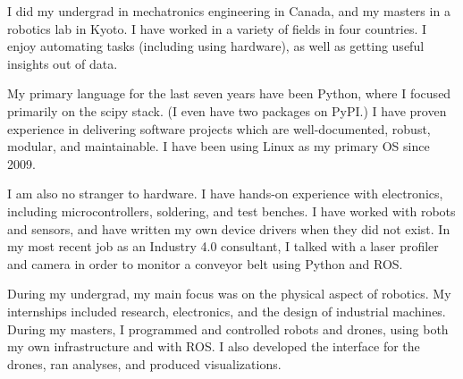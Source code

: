 I did my undergrad in mechatronics engineering in Canada, and my masters in a robotics lab in Kyoto. I have worked in a variety of fields in four countries. I enjoy automating tasks (including using hardware), as well as getting useful insights out of data.

My primary language for the last seven years have been Python, where I focused primarily on the scipy stack. (I even have two packages on PyPI.) I have proven experience in delivering software projects which are well-documented, robust, modular, and maintainable. I have been using Linux as my primary OS since 2009.

I am also no stranger to hardware. I have hands-on experience with electronics, including microcontrollers, soldering, and test benches. I have worked with robots and sensors, and have written my own device drivers when they did not exist. In my most recent job as an Industry 4.0 consultant, I talked with a laser profiler and camera in order to monitor a conveyor belt using Python and ROS.

During my undergrad, my main focus was on the physical aspect of robotics. My internships included research, electronics, and the design of industrial machines. During my masters, I programmed and controlled robots and drones, using both my own infrastructure and with ROS. I also developed the interface for the drones, ran analyses, and produced visualizations.
